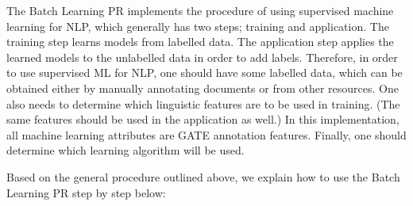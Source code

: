 
The Batch Learning PR implements the procedure of using supervised machine
learning for NLP, which generally has two steps; training and application.  The
training step learns models from labelled data. The application step applies the
learned models to the unlabelled data in order to add labels. Therefore, in order
to use supervised ML for NLP, one should have some labelled data, which can be
obtained either by manually annotating documents or from other resources. One
also needs to determine which linguistic features are to be used in training.
(The same features should be used in the application as well.) In this
implementation, all machine learning attributes are GATE annotation features. 
Finally, one should determine which learning algorithm will be used.

Based on the general procedure outlined above, we explain how to use the Batch
Learning PR step by step below:

